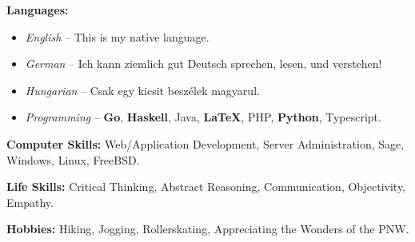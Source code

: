 \documentclass[margin]{res} %
\begin{document}
\begin{resume}
{\bf Languages:}
\begin{itemize} \itemsep -2pt
	\item {\sl English} -- This is my native language.
	\item {\sl German} -- Ich kann ziemlich gut Deutsch sprechen, lesen, und verstehen!
	\item {\sl Hungarian} -- Csak egy kicsit besz\'elek magyarul.
	\item {\sl Programming} -- {\bf Go}, {\bf Haskell}, Java, {\bf \LaTeX}, PHP, {\bf Python}, Typescript.
\end{itemize}
{\bf Computer Skills:} Web/Application Development, Server Administration, Sage, Windows, Linux, FreeBSD.

{\bf Life Skills:} Critical Thinking, Abstract Reasoning, Communication, Objectivity, Empathy.

{\bf Hobbies:} Hiking, Jogging, Rollerskating, Appreciating the Wonders of the PNW.



\end{resume}
\end{document}
